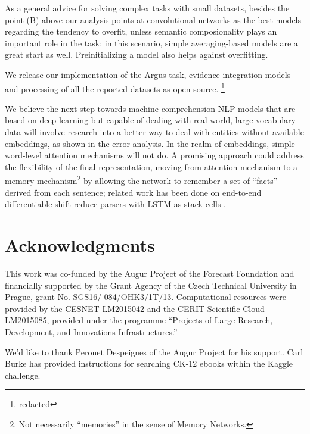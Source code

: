 \documentclass[11pt]{article}
\begin{document}
As a general advice for solving complex tasks with small datasets,
besides the point (B) above our analysis points at convolutional networks
as the best models regarding the tendency to overfit, unless
semantic composionality plays an important role in the task;
in this scenario, simple averaging-based models are a great start as well.
Preinitializing a model also helps against overfitting.

We release our implementation of the Argus task, evidence integration
models and processing of all the reported datasets as open source.%
\footnote{redacted}

We believe the next step towards machine comprehension NLP models
that are based on deep learning but capable of dealing with real-world,
large-vocabulary data will involve research into a better way to deal with
entities without available embeddings, as shown in the error analysis.
In the realm of embeddings, simple word-level attention mechanisms will not do.
A promising approach could address
the flexibility of the final representation, moving from attention mechanism
to a memory mechanism\footnote{Not necessarily ``memories'' in the sense of Memory Networks.}
by allowing the network to remember a set of ``facts'' derived from each sentence;
related work has been done on end-to-end differentiable shift-reduce parsers
with LSTM as stack cells \cite{EndToEndParsing}.


\section*{Acknowledgments}
{\footnotesize
	This work was co-funded by the Augur Project of the Forecast Foundation
and financially supported by the Grant Agency of the Czech Technical
University in Prague, grant No. SGS16/ 084/OHK3/1T/13.
Computational resources were provided by the CESNET LM2015042 and the CERIT Scientific Cloud LM2015085,
provided under the programme ``Projects of Large Research, Development, and Innovations Infrastructures.''

We'd like to thank Peronet Despeignes of the Augur Project for his support.
Carl Burke has provided instructions for searching CK-12 ebooks within
the Kaggle challenge.}



\end{document}
